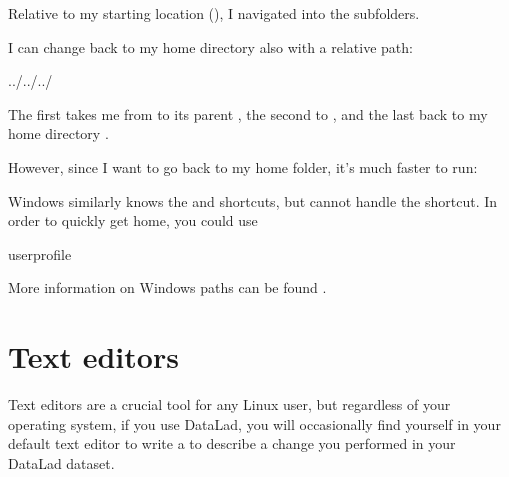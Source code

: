\sphinxAtStartPar
Relative to my starting location (), I navigated into the subfolders.

\sphinxAtStartPar
I can change back to my home directory also with a relative path:

\begin{sphinxVerbatim}[commandchars=\\\{\}]
../../../
\end{sphinxVerbatim}

\sphinxAtStartPar
The first  takes me from  to its parent , the
second  to , and the last 
back to my home directory .

\sphinxAtStartPar
However, since I want to go back to my home folder, it’s much faster to run:

\begin{sphinxVerbatim}[commandchars=\\\{\}]
\PYGZti{}
\end{sphinxVerbatim}

\sphinxAtStartPar
Windows similarly knows the  and  shortcuts, but cannot handle the \sphinxcode{\sphinxupquote{\textasciitilde{}}} shortcut.
In order to quickly get home, you could use

\begin{sphinxVerbatim}[commandchars=\\\{\}]
\PYGZpc{}userprofile\PYGZpc{}
\end{sphinxVerbatim}

\sphinxAtStartPar
More information on Windows paths can be found .


\section{Text editors}
\label{\detokenize{intro/howto:text-editors}}
\sphinxAtStartPar
Text editors are a crucial tool for any Linux user, but regardless of your operating system,
if you use DataLad, you will occasionally find yourself in your default text editor to write
a {\hyperref[\detokenize{glossary:term-commit-message}]{}} to describe a change you performed in your DataLad dataset.

